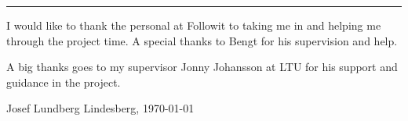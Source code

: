 \vspace{-10ex}%
\rule{\textwidth}{0.3pt}
\vspace{5ex}


I would like to thank the personal at Followit to taking me in and helping me through the project time. A special thanks to Bengt for his supervision and help. 

A big thanks goes to my supervisor Jonny Johansson at LTU for his support and guidance in the project.

\begin{flushright}
Josef Lundberg
\newline
Lindesberg, \today
\end{flushright}

\begin{comment}
- Rätta till bilden med VHF skalan
- Räkna och visa den koplexa polerna mm för chebychev


\end{comment}